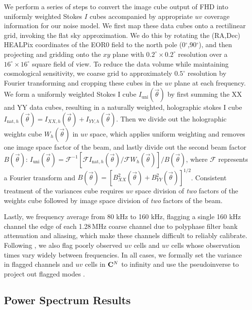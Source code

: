 We perform a series of steps to convert the image cube output of FHD into uniformly weighted Stokes $I$ cubes accompanied by appropriate $uv$ coverage information for our noise model. We first map these data cubes onto a rectilinear grid, invoking the flat sky approximation. We do this by rotating the (RA,Dec) HEALPix coordinates of the EOR0 field to the north pole (0$^\circ$,90$^\circ$), and then projecting and gridding onto the $xy$ plane with $0.2^\circ\times0.2^\circ$ resolution over a $16^\circ\times16^\circ$ square field of view. To reduce the data volume while maintaining cosmological sensitivity, we coarse grid to approximately $0.5^\circ$ resolution by Fourier transforming and cropping these cubes in the $uv$ plane at each frequency. We form a uniformly weighted Stokes I cube $I_{\text{uni}}(\vec{\theta})$ by first summing the XX and YY data cubes, resulting in a naturally weighted, holographic stokes I cube $I_{\text{nat},h}(\vec{\theta})  = I_{XX,h}(\vec{\theta})+I_{YY,h}(\vec{\theta})$. Then we divide out the holographic weights cube $W_h({\vec{\theta}})$ in $uv$ space, which applies uniform weighting and removes one image space factor of the beam, and lastly divide out the second beam factor $B(\vec{\theta})$: $I_{\text{uni}}(\vec{\theta}) = \mathcal{F}^{-1}[\mathcal{F}I_{\text{nat},h}(\vec{\theta})/\mathcal{F}W_h(\vec{\theta})]/B(\vec{\theta})$, where $\mathcal{F}$ represents a Fourier transform and $B(\vec{\theta}) = [B_{XX}^2(\vec{\theta})+B_{YY}^2(\vec{\theta})]^{1/2}$. Consistent treatment of the variances cube requires $uv$ space division of {\it two} factors of the weights cube followed by image space division of {\it two} factors of the beam.

Lastly, we frequency average from 80 kHz to 160 kHz, flagging a single 160 kHz channel the edge of each 1.28\,MHz coarse channel due to polyphase filter bank attenuation and aliasing, which make these channels difficult to reliably calibrate. Following \cite{X13}, we also flag poorly observed $uv$ cells and $uv$ cells whose observation times vary widely between frequencies. In all cases, we formally set the variance in flagged channels and $uv$ cells in $\mathbf{C}^N$ to infinity and use the pseudoinverse to project out flagged modes \cite{X13}. 
 
  
\subsection{Power Spectrum Results}
 

